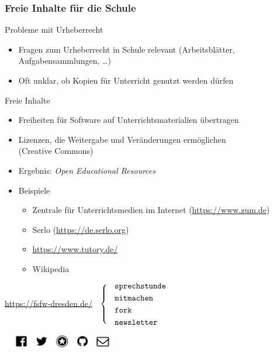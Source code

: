 \documentclass{beamer}
\begin{document}
\begin{frame}
  \frametitle{Freie Inhalte für die Schule}

  \onslide<+->

  \begin{block}{Probleme mit Urheberrecht}
    \begin{itemize}
    \item Fragen zum Urheberrecht in Schule relevant (Arbeitsblätter,
      Aufgabensammlungen, \dots)
    \item Oft unklar, ob Kopien für Unterricht genutzt werden dürfen
    \end{itemize}
  \end{block}

  \onslide<+->

  \begin{block}{Freie Inhalte}
    \begin{itemize}
    \item Freiheiten für Software auf Unterrichtsmaterialien übertragen
    \item Lizenzen, die Weitergabe und Veränderungen ermöglichen \\
      (Creative Commons)
    \item Ergebnis: \emph{Open Educational Resources}
    \item Beispiele
      \begin{itemize}
      \item Zentrale für Unterrichtsmedien im Internet
        (\url{https://www.zum.de})
      \item Serlo (\url{https://de.serlo.org})
      \item \url{https://www.tutory.de/}
      \item Wikipedia
      \end{itemize}
    \end{itemize}
  \end{block}

\end{frame}

\begin{frame}

  \onslide<+->


  \begin{center}
    \url{https://fsfw-dresden.de/}
    $\;\;\left\{\;\;\text{
        \parbox{2.3cm}{
          \texttt{sprechstunde}\\[1mm]
          \texttt{mitmachen}\\[1mm]
          \texttt{fork}\\[1mm]
          \texttt{newsletter}
        }}
    \right.$

    \vspace*{2\bigskipamount}

    \includegraphics[width=50mm]{fsfw-netzwerke}
  \end{center}

\end{frame}
\end{document}

